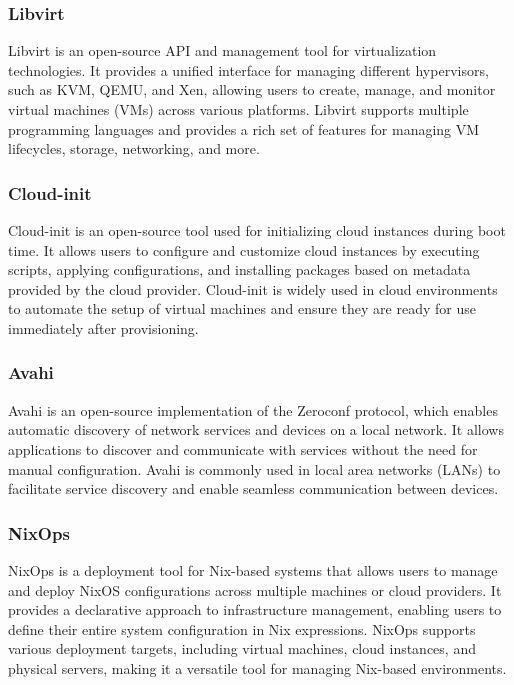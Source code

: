\subsubsection{Libvirt}
\label{sec:libvirt}
Libvirt is an open-source API and management tool for virtualization technologies. It provides a unified interface for managing different hypervisors, such as KVM, QEMU, and Xen, allowing users to create, manage, and monitor virtual machines (VMs) across various platforms. Libvirt supports multiple programming languages and provides a rich set of features for managing VM lifecycles, storage, networking, and more.

\subsubsection{Cloud-init}
\label{sec:cloud-init}
Cloud-init is an open-source tool used for initializing cloud instances during boot time. It allows users to configure and customize cloud instances by executing scripts, applying configurations, and installing packages based on metadata provided by the cloud provider. Cloud-init is widely used in cloud environments to automate the setup of virtual machines and ensure they are ready for use immediately after provisioning.

\subsubsection{Avahi}
\label{sec:avahi}
Avahi is an open-source implementation of the Zeroconf protocol, which enables automatic discovery of network services and devices on a local network. It allows applications to discover and communicate with services without the need for manual configuration. Avahi is commonly used in local area networks (LANs) to facilitate service discovery and enable seamless communication between devices.

\subsubsection{NixOps}
\label{sec:nixops}

NixOps is a deployment tool for Nix-based systems that allows users to manage and deploy NixOS configurations across multiple machines or cloud providers. It provides a declarative approach to infrastructure management, enabling users to define their entire system configuration in Nix expressions. NixOps supports various deployment targets, including virtual machines, cloud instances, and physical servers, making it a versatile tool for managing Nix-based environments.